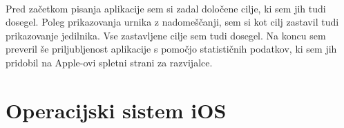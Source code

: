 \documentclass[a4paper, 12pt]{article}
\begin{document}
	\paragraph{} Pred začetkom pisanja aplikacije sem si zadal določene cilje, ki sem jih tudi dosegel. Poleg prikazovanja urnika z nadomeščanji, sem si kot cilj zastavil tudi prikazovanje jedilnika. Vse zastavljene cilje sem tudi dosegel. Na koncu sem preveril še priljubljenost aplikacije s pomočjo statističnih podatkov, ki sem jih pridobil na Apple-ovi spletni strani za razvijalce.
	
	\section{Operacijski sistem iOS}
\end{document}
